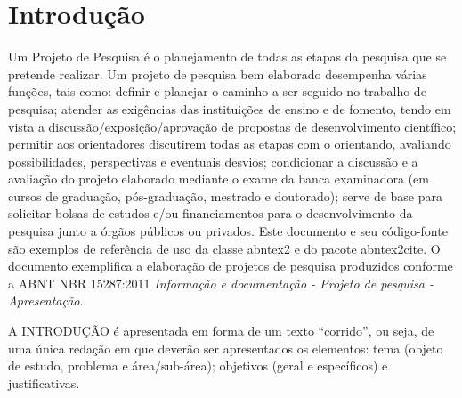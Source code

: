 \documentclass[
12pt,				%
openright,			%
oneside,
a4paper,			%
english,			%
french,				%
spanish,			%
brazil,				%
]{abntex2}
\begin{document}
	\chapter*[Introdução]{Introdução}
	
	Um Projeto de Pesquisa é o planejamento de todas as etapas da pesquisa que se pretende realizar. Um projeto de pesquisa bem elaborado desempenha várias funções, tais como: definir e planejar o caminho a ser seguido no trabalho de pesquisa; atender as exigências das instituições de ensino e de fomento, tendo em vista a discussão/exposição/aprovação de propostas de desenvolvimento científico; permitir aos orientadores discutirem todas as etapas com o orientando, avaliando possibilidades, perspectivas e eventuais desvios; condicionar a discussão e a avaliação do projeto elaborado mediante o exame da banca examinadora (em cursos de graduação, pós-graduação, mestrado e doutorado); serve de base para solicitar bolsas de estudos e/ou financiamentos para o desenvolvimento da pesquisa junto a órgãos públicos ou privados.  
	Este documento e seu código-fonte são exemplos de referência de uso da classe
	\textsf{abntex2} e do pacote \textsf{abntex2cite}. O documento 
	exemplifica a elaboração de projetos de pesquisa produzidos
	conforme a ABNT NBR 15287:2011 \emph{Informação e documentação - Projeto de
		pesquisa - Apresentação}. 
	
	A INTRODUÇÃO é apresentada em forma de um texto “corrido”, ou seja, de uma única redação em que deverão ser apresentados os elementos: tema (objeto de estudo, problema e área/sub-área); objetivos (geral e específicos) e justificativas.
	
\end{document}
